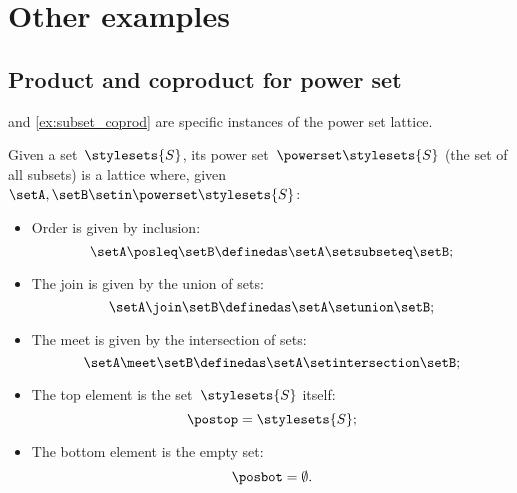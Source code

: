 
\section{Other examples}

\subsection{Product and coproduct for power set}
 and \cref{ex:subset_coprod} are specific instances of the power set lattice.

\begin{ctdefinition}
    \label{def:power-set-as-lattice}
    Given a set~$\stylesets{S}$, its power set~$\powerset \stylesets{S}$ (the set of all subsets) is a lattice where, given~$\setA,\setB\setin \powerset \stylesets{S}$:
    \begin{itemize}
        \item Order is given by inclusion:
              \begin{equation*}
                  \setA\posleq \setB \definedas \setA\setsubseteq \setB;
              \end{equation*}
        \item The join is given by the union of sets:
              \begin{equation*}
                  \setA\join \setB \definedas \setA\setunion \setB;
              \end{equation*}
        \item The meet is given by the intersection of sets:
              \begin{equation*}
                  \setA\meet \setB \definedas \setA\setintersection \setB;
              \end{equation*}
        \item The top element is the set~$\stylesets{S}$ itself:
              \begin{equation*}
                  \postop = \stylesets{S};
              \end{equation*}
        \item The bottom element is the empty set:
              \begin{equation*}
                  \posbot = \emptyset.
              \end{equation*}
    \end{itemize}
\end{ctdefinition}

